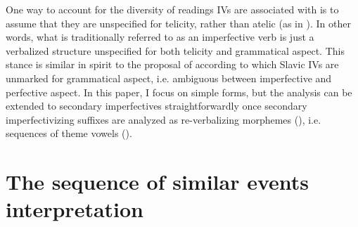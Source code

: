 \documentclass[output=paper,colorlinks,citecolor=brown]{langscibook}
\begin{document}
\noindent One way to account for the diversity of readings IVs are associated with is to assume that they are unspecified for telicity, rather than atelic (as  in \citealt[]{Łazorczyk2010}). In other words, what is traditionally referred to as an imperfective verb is just a verbalized structure unspecified for both telicity and grammatical aspect. This stance is similar in spirit to the proposal of \citet[]{Arsenijević2018} according to which Slavic IVs are unmarked for grammatical aspect, i.e. ambiguous between imperfective and perfective aspect. In this paper, I focus on simple forms, but the analysis can be extended to secondary imperfectives straightforwardly once secondary imperfectivizing suffixes are analyzed as re-verbalizing morphemes (\citealt{Arsenijević2018}), i.e. sequences of theme vowels (\citealt{SimonovićArsMil2021}).

\section{The sequence of similar events interpretation} \label{mil:sec:SSE}
\end{document}
